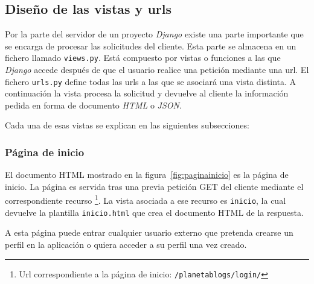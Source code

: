 \documentclass[a4paper, 12pt]{book}
\begin{document}
\subsection{Dise\~no de las vistas y urls} 
\label{sec:vistasurls}
Por la parte del servidor de un proyecto \textit{Django} existe una parte importante que se encarga de procesar las solicitudes del cliente. Esta parte se
almacena en un fichero llamado \texttt{views.py}. Est\'a compuesto por vistas o funciones a las que \textit{Django} accede despu\'es de que el usuario 
realice una petici\'on mediante una url. El fichero \texttt{urls.py} define todas las urls a las que se asociar\'a una vista distinta. A continuaci\'on
la vista procesa la solicitud y devuelve al cliente la informaci\'on pedida en forma de documento \textit{HTML} o \textit{JSON}.

Cada una de esas vistas se explican en las siguientes subsecciones:

\subsubsection{P\'agina de inicio} 
\label{sec:paginainicio}
El documento HTML mostrado en la figura~\ref{fig:paginainicio} es la p\'agina de inicio. La p\'agina es servida tras una previa petici\'on GET del cliente 
mediante el correspondiente recurso \footnote{Url correspondiente a la p\'agina de inicio: \texttt{/planetablogs/login/}}. La vista asociada a ese recurso 
es \texttt{inicio}, la cual devuelve la plantilla \texttt{inicio.html} que crea el documento HTML de la respuesta.

A esta p\'agina puede entrar cualquier usuario externo que pretenda crearse un perfil en la aplicaci\'on o quiera acceder a su perfil una vez creado.
\end{document}
